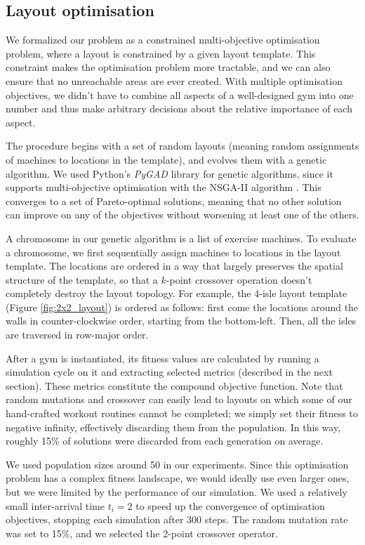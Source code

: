 \documentclass[9pt]{pnas-new}
\begin{document}
\subsection*{Layout optimisation}

We formalized our problem as a constrained multi-objective optimisation problem,
where a layout is constrained by a given layout template.
This constraint makes the optimisation problem more tractable,
and we can also ensure that no unreachable areas are ever created.
With multiple optimisation objectives, we didn't have to combine all aspects of a well-designed gym into one number and thus make arbitrary decisions about the relative importance of each aspect.

The procedure begins with a set of random layouts (meaning random assignments of machines to locations in the template),
and evolves them with a genetic algorithm.
We used Python's {\it PyGAD} library for genetic algorithms, since it supports multi-objective optimisation with the NSGA-II algorithm \cite{nsga2}. This converges to a set of Pareto-optimal solutions, meaning that no other solution can improve on any of the objectives without worsening at least one of the others.

A chromosome in our genetic algorithm is a list of exercise machines. To evaluate a chromosome, we first sequentially assign machines to locations in the layout template.
The locations are ordered in a way that largely preserves the spatial structure of the template,
so that a $k$-point crossover operation doesn't completely destroy the layout topology.
For example, the 4-isle layout template (Figure \ref{fig:2x2_layout}) is ordered as follows: first come the locations around the walls in counter-clockwise order, starting from the bottom-left. Then, all the isles are traversed in row-major order.

After a gym is instantiated, its fitness values are calculated
by running a simulation cycle on it and extracting selected metrics (described in the next section). These metrics constitute the compound objective function.
Note that random mutations and crossover can easily lead to layouts on which some of our hand-crafted workout routines cannot be completed;
we simply set their fitness to negative infinity, effectively discarding them from the population.
In this way, roughly 15\% of solutions were discarded from each generation on average.

We used population sizes around 50 in our experiments. Since this optimisation problem has a complex fitness landscape, we would ideally use even larger ones, but we were limited by the performance of our simulation.
We used a relatively small inter-arrival time $t_i = 2$ to speed up the convergence of optimisation objectives, stopping each simulation after 300 steps.
The random mutation rate was set to 15\%, and we selected the 2-point crossover operator.
\end{document}
